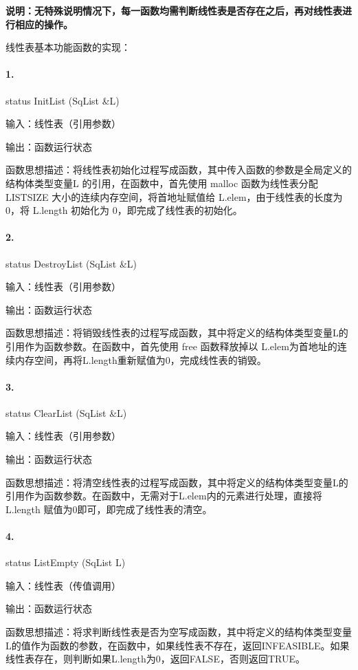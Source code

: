 \documentclass[supercite]{Experimental_Report}
\theoremstyle{definition}
\begin{document}
\textbf{说明：无特殊说明情况下，每一函数均需判断线性表是否存在之后，再对线性表进行相应的操作。}

线性表基本功能函数的实现：

\paragraph{ 1.} status InitList (SqList \&L)

输入：线性表（引用参数）

输出：函数运行状态

函数思想描述：将线性表初始化过程写成函数，其中传入函数的参数是全局定义的结构体类型变量L 的引用，在函数中，首先使用 malloc 函数为线性表分配LISTSIZE 大小的连续内存空间，将首地址赋值给 L.elem，由于线性表的长度为 0，将 L.length 初始化为 0，即完成了线性表的初始化。

\paragraph{ 2.} status DestroyList (SqList \&L)

输入：线性表（引用参数）

输出：函数运行状态

函数思想描述：将销毁线性表的过程写成函数，其中将定义的结构体类型变量L的引用作为函数参数。在函数中，首先使用 free 函数释放掉以 L.elem为首地址的连续内存空间，再将L.length重新赋值为0，完成线性表的销毁。


\paragraph{ 3.}status ClearList (SqList \&L)

输入：线性表（引用参数）

输出：函数运行状态

函数思想描述：将清空线性表的过程写成函数，其中将定义的结构体类型变量L的引用作为函数参数。在函数中，无需对于L.elem内的元素进行处理，直接将L.length 赋值为0即可，即完成了线性表的清空。


\paragraph{ 4.}status ListEmpty (SqList L)

输入：线性表（传值调用）

输出：函数运行状态

函数思想描述：将求判断线性表是否为空写成函数，其中将定义的结构体类型变量L的值作为函数的参数，在函数中，如果线性表不存在，返回INFEASIBLE。如果线性表存在，则判断如果L.length为0，返回FALSE，否则返回TRUE。
\end{document}
